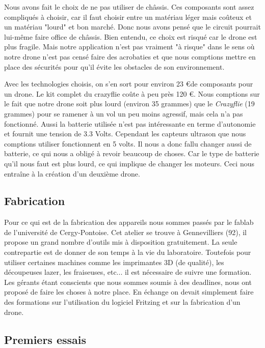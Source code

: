 \documentclass[a4paper,10pt]{report}
\begin{document}
      \newpage
      Nous avons fait le choix de ne pas utiliser de châssis. Ces composants sont assez compliqués à choisir, car il faut choisir entre
      un matériau léger mais coûteux et un matériau "lourd" et bon marché. Donc nous avons pensé que le circuit pourrait lui-même faire
      office de châssis. Bien entendu, ce choix est risqué car le drone est plus fragile. Mais notre application n'est pas vraiment
      "à risque" dans le sens où notre drone n'est pas censé faire des acrobaties et que nous comptions mettre en place des sécurités
      pour qu'il évite les obstacles de son environnement.
      
      Avec les technologies choisis, on s'en sort pour environ 23 \euro de composants pour un drone. Le kit complet du crazyflie coûte
      à peu près 120 \euro. Nous comptions sur le fait que notre drone soit plus lourd (environ 35 grammes) que le \textit{Crazyflie} 
      (19 grammes) pour se ramener à un vol un peu moins agressif, mais cela n'a pas fonctionné. Aussi la batterie utilisée n'est pas
      intéressante en terme d'autonomie et fournit une tension de 3.3 Volts. Cependant les capteurs ultrason que nous comptions utiliser
      fonctionnent en 5 volts. Il nous a donc fallu changer aussi de batterie, ce qui nous a obligé à revoir beaucoup de choses. Car le type
      de batterie qu'il nous faut est plus lourd, ce qui implique de changer les moteurs. Ceci nous entraîne à la création d'un deuxième
      drone.
      
	\subsection{Fabrication}
	  Pour ce qui est de la fabrication des appareils nous sommes passés 
par le fablab\cite{faclab} de l'université de Cergy-Pontoise. Cet atelier se 
trouve à Gennevilliers (92), il propose un grand nombre d'outils mis à 
disposition gratuitement. La seule contrepartie est de donner de son temps à 
la vie du laboratoire. Toutefois pour utiliser certaines machines comme les 
imprimantes 3D (de qualité), les découpeuses lazer, les fraiseuses, etc... il 
est nécessaire de suivre une formation. Les gérants étant conscients que 
nous sommes soumis à des deadlines, nous ont proposé de faire les choses à 
notre place. En échange on devait simplement faire des formations sur 
l'utilisation du logiciel Fritzing et sur la fabrication d'un drone.

	\subsection{Premiers essais}
\end{document}
